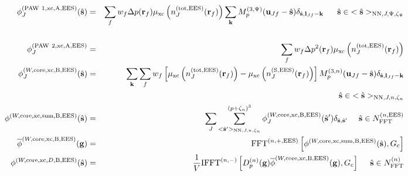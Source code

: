 \documentclass[paper=a4, fontsize=11pt]{article} %
\numberwithin{equation}{section} %
\numberwithin{figure}{section} %
\numberwithin{table}{section} %
\newcommand{\ol}{\overline}
\newcommand{\bu}{{\bf{u}}}
\newcommand{\bl}{{\bf{l}}}
\newcommand{\bk}{{\bf{k}}}
\newcommand{\bs}{{\bf{s}}}
\newcommand{\bg}{{\bf{g}}}
\newcommand{\br}{{\bf{r}}}
\newcommand{\hs}{{\hat{\bf{s}}}}
\newcommand{\rS}{{\mathrm{S}}}
\newcommand{\rEES}{{\mathrm{EES}}}
\newcommand{\rxc}{{\mathrm{xc}}}
\newcommand{\rcore}{{\mathrm{core}}}
\newcommand{\rNN}{{\mathrm{NN}}}
\newcommand{\rP}{{\mathrm{PAW}}}
\newcommand{\rA}{{\mathrm{A}}}
\newcommand{\rB}{{\mathrm{B}}}
\newcommand{\rsum}{{\mathrm{sum}}}
\newcommand{\rtot}{{\mathrm{tot}}}
\newcommand{\NFFTn}{{N^{(n)}_{\mathrm{FFT}}}}
\newcommand{\NFFTnEES}{{N^{(n,\rEES)}_{\mathrm{FFT}}}}
\newcommand{\Gc}{{G_{\mathrm{c}}}}
\newcommand{\Dng}{{D^{(n)}_p(\bg)}}
\newcommand{\Mn}{{M_p^{(3,n)}}}
\newcommand{\Mp}{{M_p^{(3,\Psi)}}}
\newcommand{\FFTnEES}{{\mathrm{FFT}^{(n,+,\rEES)}}}
\newcommand{\IFFTni}{{\mathrm{IFFT}^{(n,-)}}}
\newcommand{\pzn}{{(p+\zeta_n)^3}}
\newcommand{\hsJp}{{<\hs>_{\rNN,J,\Psi,\zeta_\Psi}}}
\newcommand{\hsJn}{{<\hs>_{\rNN,J,n,\zeta_n}}}
\newcommand{\hsinJp}{{\ \ \ \ \ \hs  \in  \hsJp}}
\newcommand{\hsinJn}{{\ \ \ \ \ \hs  \in  \hsJn}}
\newcommand{\hspJn}{{<\hs'>_{\rNN,J,n,\zeta_n}}}
\newcommand{\hsinnEES}{{\ \ \ \ \hs \in \NFFTnEES}}
\newcommand{\hsinn}{{\ \ \ \ \hs \in \NFFTn}}
\begin{document}
\begin{eqnarray}
\label{phi:sPAW1xcA}
\phi_J^{(\rP\ 1,\rxc,\rA,\rEES)}(\hs) &=& \sum_f w_f \Delta p(\br_f) \mu_{\rxc}\left(n_J^{(\rtot,\rEES)}(\br_f)\right)  \sum_{\bk} \Mp(\bu_{Jf}-\hat \bs)\delta_{\hat \bs,\bl_{Jf}-\bk} \hsinJp\nonumber\\
&\ &\\
\label{phi:PAW2xcA}
\phi_J^{(\rP\ 2,\rxc,\rA,\rEES)} &=& \sum_f w_f \Delta p^2(\br_f) \mu_{\rxc}\left(n_J^{(\rtot,\rEES)}(\br_f)\right)  \\
\phi_J^{(W,\rcore,\rxc,\rB,\rEES)}(\hs)&=&  \sum_{\bk} \sum_f w_f \left[\mu_{\rxc} \left(  n^{(\rtot,\rEES)}_J(\br_f)  \right) -\mu_{\rxc}\left(n_J^{(\rS,\rEES)}(\br_f)\right)\right] \Mn(\bu_{Jf}-\hat \bs)\delta_{\hat \bs,\bl_{Jf}-\bk} \nonumber \\
 &&\hspace*{3.1 in} \hsinJn \\
\phi^{(W,\rcore,\rxc,\rsum,\rB,\rEES)}(\hs)
&=& \sum_J \sum_{\hspJn}^\pzn \phi_J^{(W,\rcore,\rxc,\rB,\rEES)}(\hs')\delta_{\hs,\hs'}  \hsinnEES \\
\label{phi:phigxcoreB}
\ol \phi^{(W,\rcore,\rxc,\rB,\rEES)}(\bg) &=& \FFTnEES  \left[ \phi^{(W,\rcore,\rxc,\rsum,\rB,\rEES)}(\hs),\Gc \right]\\
\label{phi:phixccoreDB}
\phi^{(W,\rcore,\rxc,D,\rB,\rEES)}(\hs) &=& \frac{1}{V} \IFFTni \left[ \Dng \ol \phi^{(W,\rcore,\rxc,\rB,\rEES)}(\bg),\Gc\right] \hsinn 
\end{eqnarray}\\
\end{document}
